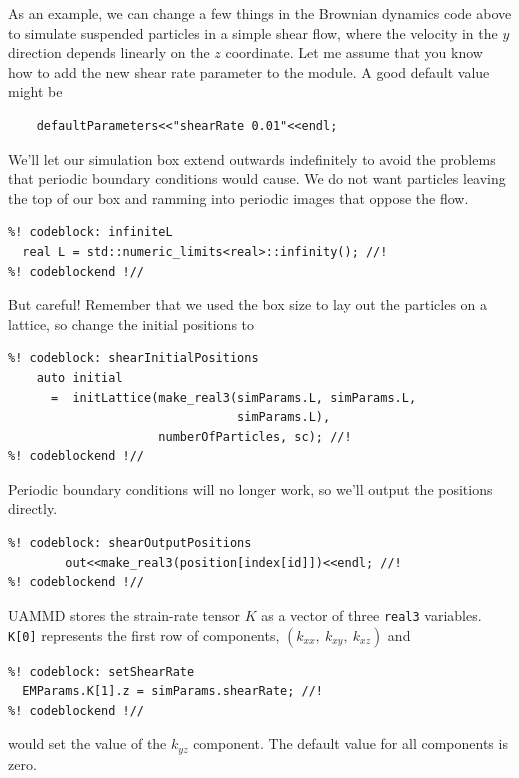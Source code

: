 As an example, we can change a few things in the Brownian dynamics code above to 
simulate suspended particles in a simple shear flow, where the velocity in the 
$y$ direction depends linearly on the $z$ coordinate. Let me assume that you 
know how to add the new shear rate parameter to the module. A good default value 
might be
\begin{lstlisting}
    defaultParameters<<"shearRate 0.01"<<endl;
\end{lstlisting}
We'll let our simulation box extend outwards indefinitely to avoid the problems 
that periodic boundary conditions would cause. We do not want particles leaving 
the top of our box and ramming into periodic images that oppose the flow.
\begin{lstlisting}
%! codeblock: infiniteL
  real L = std::numeric_limits<real>::infinity(); //!
%! codeblockend !//
\end{lstlisting}
But careful! Remember that we used the box size to lay out the particles on a 
lattice, so change the initial positions to
\begin{lstlisting}
%! codeblock: shearInitialPositions
    auto initial
      =  initLattice(make_real3(simParams.L, simParams.L,
                                simParams.L),
                     numberOfParticles, sc); //!
%! codeblockend !//
\end{lstlisting}
Periodic boundary conditions will no longer work, so we'll output the positions 
directly.
\begin{lstlisting}
%! codeblock: shearOutputPositions
        out<<make_real3(position[index[id]])<<endl; //!
%! codeblockend !//
\end{lstlisting}

UAMMD stores the strain-rate tensor $K$ as a vector of three \texttt{real3} 
variables. \texttt{K[0]} represents the first row of components,
$(k_{xx},\ k_{xy},\ k_{xz})$ and
\begin{lstlisting}
%! codeblock: setShearRate
  EMParams.K[1].z = simParams.shearRate; //!
%! codeblockend !//
\end{lstlisting}
would set the value of the $k_{yz}$ component. The default value for all 
components is zero.


